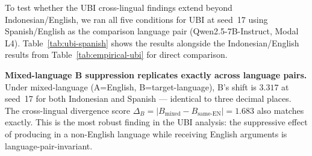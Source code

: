 \documentclass{article}
\begin{document}
To test whether the UBI cross-lingual findings extend beyond Indonesian/English, we ran all five conditions for UBI at seed~17 using Spanish/English as the comparison language pair (Qwen2.5-7B-Instruct, Modal L4). Table~\ref{tab:ubi-spanish} shows the results alongside the Indonesian/English results from Table~\ref{tab:empirical-ubi} for direct comparison.

\begin{table}[h]
\centering
\caption{UBI five-condition comparison across two language pairs (Qwen2.5-7B-Instruct, seed~17). L2 shift in 8D Schwartz space.}
\label{tab:ubi-spanish}
\end{table}

\textbf{Mixed-language B suppression replicates exactly across language pairs.} Under mixed-language (A=English, B=target-language), B's shift is $3.317$ at seed~17 for both Indonesian and Spanish --- identical to three decimal places. The cross-lingual divergence score $\Delta_B = |B_{\mathrm{mixed}} - B_{\mathrm{same\text{-}EN}}| = 1.683$ also matches exactly. This is the most robust finding in the UBI analysis: the suppressive effect of producing in a non-English language while receiving English arguments is language-pair-invariant.
\end{document}
